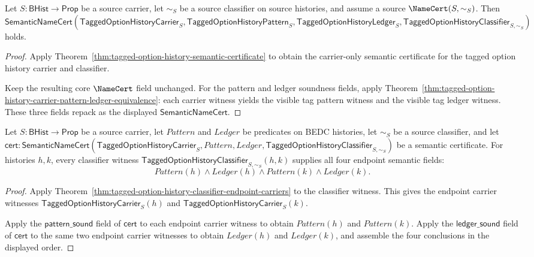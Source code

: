 \begin{theorem}
\label{thm:tagged-option-history-visible-semantic-certificate}
Let $S:\mathsf{BHist}\to\mathsf{Prop}$ be a source carrier, let $\sim_S$ be a
source classifier on source histories, and assume a source
$\NameCert(S,\sim_S)$. Then
$\mathsf{SemanticNameCert}(\mathsf{TaggedOptionHistoryCarrier}_S,
\mathsf{TaggedOptionHistoryPattern}_S,\mathsf{TaggedOptionHistoryLedger}_S,
\mathsf{TaggedOptionHistoryClassifier}_{S,\sim_S})$ holds.
\end{theorem}
\begin{proof}
Apply Theorem~\ref{thm:tagged-option-history-semantic-certificate} to obtain
the carrier-only semantic certificate for the tagged option history carrier and
classifier.

Keep the resulting core $\NameCert$ field unchanged. For the pattern and ledger
soundness fields, apply
Theorem~\ref{thm:tagged-option-history-carrier-pattern-ledger-equivalence}: each
carrier witness yields the visible tag pattern witness and the visible tag
ledger witness. These three fields repack as the displayed
$\mathsf{SemanticNameCert}$.
\end{proof}

\begin{theorem}
\label{thm:tagged-option-history-classifier-endpoint-semantic-fields}
Let $S:\mathsf{BHist}\to\mathsf{Prop}$ be a source carrier, let $Pattern$ and
$Ledger$ be predicates on BEDC histories, let $\sim_S$ be a source classifier,
and let
$\mathsf{cert}:\mathsf{SemanticNameCert}(\mathsf{TaggedOptionHistoryCarrier}_S,
Pattern,Ledger,\mathsf{TaggedOptionHistoryClassifier}_{S,\sim_S})$ be a
semantic certificate. For histories $h,k$, every classifier witness
$\mathsf{TaggedOptionHistoryClassifier}_{S,\sim_S}(h,k)$ supplies all four
endpoint semantic fields:
$$
Pattern(h)\land Ledger(h)\land Pattern(k)\land Ledger(k).
$$
\end{theorem}
\begin{proof}
Apply Theorem~\ref{thm:tagged-option-history-classifier-endpoint-carriers} to
the classifier witness. This gives the endpoint carrier witnesses
$\mathsf{TaggedOptionHistoryCarrier}_S(h)$ and
$\mathsf{TaggedOptionHistoryCarrier}_S(k)$.

Apply the $\mathsf{pattern\_sound}$ field of $\mathsf{cert}$ to each endpoint
carrier witness to obtain $Pattern(h)$ and $Pattern(k)$. Apply the
$\mathsf{ledger\_sound}$ field of $\mathsf{cert}$ to the same two endpoint
carrier witnesses to obtain $Ledger(h)$ and $Ledger(k)$, and assemble the four
conclusions in the displayed order.
\end{proof}


